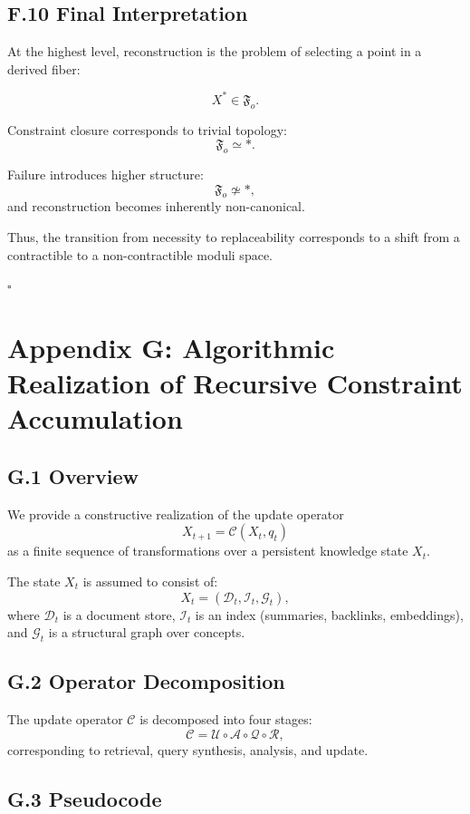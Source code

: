\documentclass[12pt, oneside]{article}
\theoremstyle{plain}
\theoremstyle{definition}
\theoremstyle{remark}
\begin{document}
\subsection{F.10 Final Interpretation}

At the highest level, reconstruction is the problem of selecting a point in a derived fiber:

\[
X^* \in \mathfrak{F}_o.
\]

Constraint closure corresponds to trivial topology:
\[
\mathfrak{F}_o \simeq *.
\]

Failure introduces higher structure:
\[
\mathfrak{F}_o \not\simeq *,
\]
and reconstruction becomes inherently non-canonical.

Thus, the transition from necessity to replaceability corresponds to a shift from a contractible to a non-contractible moduli space.

\hfill $\square$

\section{Appendix G: Algorithmic Realization of Recursive Constraint Accumulation}

\subsection{G.1 Overview}

We provide a constructive realization of the update operator
\[
X_{t+1} = \mathcal{C}(X_t, q_t)
\]
as a finite sequence of transformations over a persistent knowledge state $X_t$.

The state $X_t$ is assumed to consist of:
\[
X_t = (\mathcal{D}_t, \mathcal{I}_t, \mathcal{G}_t),
\]
where $\mathcal{D}_t$ is a document store, $\mathcal{I}_t$ is an index (summaries, backlinks, embeddings), and $\mathcal{G}_t$ is a structural graph over concepts.

\subsection{G.2 Operator Decomposition}

The update operator $\mathcal{C}$ is decomposed into four stages:
\[
\mathcal{C} = \mathcal{U} \circ \mathcal{A} \circ \mathcal{Q} \circ \mathcal{R},
\]
corresponding to retrieval, query synthesis, analysis, and update.

\subsection{G.3 Pseudocode}
\end{document}
